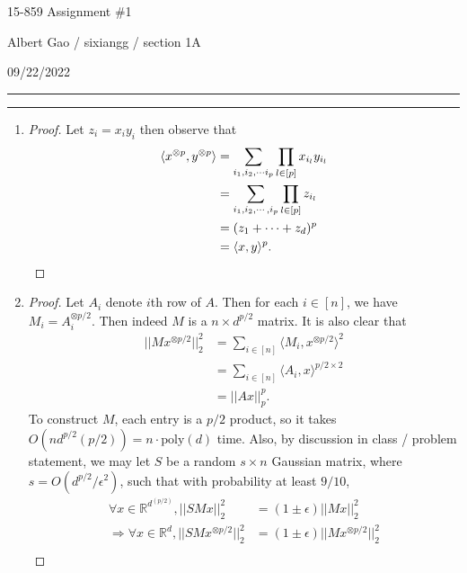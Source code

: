 \documentclass[11pt]{article}
\newcommand{\question}[1] {\vspace{.3in} \hrule\vspace{0.3em}
\noindent{\bf #1} \vspace{0.7em}
\hrule \vspace{.10in}}
\newcommand{\myinfo}{Albert Gao / sixiangg}
\newcommand{\myhwnum}{1}
\newcommand{\currdate}{09/22/2022}
\begin{document}
\bigskip                        %

\thispagestyle{plain}
\begin{center}                  %
{\Huge 15-859 Assignment \#\myhwnum}

\vspace{0.3cm}

\large{\myinfo { / section 1A}}

\large{\currdate}

\end{center}

\question{Task 1}
\begin{enumerate}[1.]
\item \begin{proof}
Let $z_i = x_iy_i$ then observe that
\begin{align*}
\langle x^{\otimes p}, y^{\otimes p}\rangle &= \sum_{i_1, i_2, \cdots i_p} \prod_{l \in [p]}x_{i_l}y_{i_l}\\
&= \sum_{i_1, i_2, \cdots, i_p} \prod_{l \in [p]} z_{i_l}\\
&= (z_1 + \cdots + z_d)^p\\
&= \langle x, y\rangle^p. \qedhere
\end{align*}
\end{proof}
\item \begin{proof}
Let $A_i$ denote $i$th row of $A$. Then for each $i \in [n]$, we have $M_i = A_i^{\otimes p/2}$. Then indeed $M$ is a $n \times d^{p/2}$ matrix. It is also clear that
\begin{align*}
    ||Mx^{\otimes p/2}||_2^2 &= \sum_{i \in [n]}{\langle M_i, x^{\otimes p/2}\rangle^2}\\
    &= \sum_{i \in [n]} \langle A_i, x \rangle^{p/2 \times 2}\\
    &= ||Ax||_p^p.
\end{align*}
To construct $M$, each entry is a $p/2$ product, so it takes $O(nd^{p/2}(p/2)) = n \cdot \text{poly}(d)$ time. Also, by discussion in class / problem statement, we may let $S$ be a random $s \times n$ Gaussian matrix, where $s = O(d^{p/2}/\epsilon^2)$, such that with probability at least $9/10$,
\begin{align*}
    \forall x \in \mathbb{R}^{d^(p/2)}, ||SMx||_2^2 &= (1 \pm \epsilon)||Mx||_2^2\\
    \Rightarrow \forall x \in \mathbb{R}^d, ||SMx^{\otimes p/2}||_2^2 &= (1 \pm \epsilon)||Mx^{\otimes p/2}||_2^2\\

\end{align*}
\end{proof}
\end{enumerate}
\end{document}
